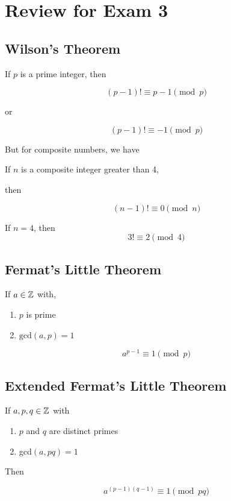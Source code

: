 \documentclass[../../Main.tex]{subfiles}
\begin{document}
\section{Review for Exam 3}

\subsection{Wilson's Theorem}

\begin{theorem}
    If $p$ is a prime integer, then

    $$(p - 1)! \equiv p - 1 \pmod{p}$$
    
    or

    $$(p - 1)! \equiv -1 \pmod{p}$$
\end{theorem}

But for composite numbers, we have

\begin{theorem}
    If $n$ is a composite integer greater than 4,

    then

    $$(n-1)! \equiv 0 \pmod{n}$$

    If $n = 4$, then $$3! \equiv 2 \pmod{4}$$
\end{theorem}

\subsection{Fermat's Little Theorem}

\begin{theorem}
    If $a \in \mathbb{Z}$ with, 
    
    \begin{enumerate}
        \item $p$ is prime
        \item $\text{gcd}(a, p) = 1$
    \end{enumerate}
 
    $$a^{p - 1} \equiv 1 \pmod{p}$$
\end{theorem}

\subsection{Extended Fermat's Little Theorem}

\begin{theorem}
    If $a, p, q \in \mathbb{Z}$ with
    
    \begin{enumerate}
        \item $p$ and $q$ are distinct primes
        \item gcd$(a, pq) = 1$
    \end{enumerate}

    Then

    $$a^{(p-1)(q-1)} \equiv 1 \pmod{pq}$$
\end{theorem}
\end{document}
